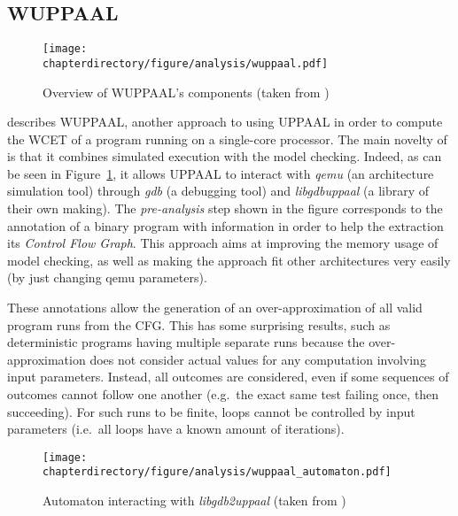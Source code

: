 \stopallthesefloats
\subsection{WUPPAAL}
\begin{figure}[hbt]
\begin{center}
\centering
\texttt{[image: \\chapterdirectory/figure/analysis/wuppaal.pdf]}
\end{center}
\caption{Overview of WUPPAAL's components (taken from \cite{wuppaal})}%
\label{fig:formal_analysis:wuppaal}
\end{figure}

\cite{wuppaal} describes WUPPAAL, another approach to using UPPAAL in order to
compute the WCET of a program running on a single-core processor. The main
novelty of \cite{wuppaal} is that it combines simulated execution with the
model checking. Indeed, as can be seen in
Figure~\ref{fig:formal_analysis:wuppaal}, it allows UPPAAL to interact with
\textit{qemu} (an architecture simulation tool) through \textit{gdb} (a
debugging tool) and \textit{libgdbuppaal} (a library of their own making). The
\textit{pre-analysis} step shown in the figure corresponds to the annotation of
a binary program with information in order to help the extraction its
\textit{Control Flow Graph}. This approach aims at improving the memory usage
of model checking, as well as making the approach fit other architectures very
easily (by just changing qemu parameters).

These annotations allow the generation of an over-approximation of all valid
program runs from the CFG. This has some surprising results, such as
deterministic programs having multiple separate runs because the
over-approximation does not consider actual values for any computation
involving input parameters. Instead, all outcomes are considered, even if some
sequences of outcomes cannot follow one another (e.g.~the exact same test
failing once, then succeeding). For such runs to be finite, loops cannot be
controlled by input parameters (i.e.~all loops have a known amount of
iterations).

\begin{figure}[hbt]
\begin{center}
\centering
\texttt{[image: \\chapterdirectory/figure/analysis/wuppaal\_automaton.pdf]}
\end{center}
\caption{Automaton interacting with \textit{libgdb2uppaal} (taken from
\cite{wuppaal})}%
\label{fig:formal_analysis:wuppaal_automaton}
\end{figure}

